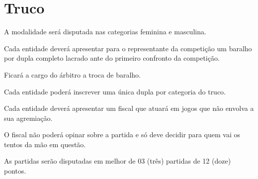 {\let\clearpage\relax \chapter{Truco}}

\begin{article}
	A modalidade será disputada nas categorias feminina e masculina.
\end{article}

\begin{article}
	Cada entidade deverá apresentar para o representante da competição um baralho por dupla completo lacrado ante do primeiro confronto da competição.

	\begin{xparagraph}
		Ficará a cargo do árbitro a troca de baralho.
	\end{xparagraph}
\end{article}

\begin{article}
	Cada entidade poderá inscrever uma única dupla por categoria do truco.
\end{article}

\begin{article}
	Cada entidade deverá apresentar um fiscal que atuará em jogos que não envolva a sua agremiação.

	\begin{xparagraph}
		O fiscal não poderá opinar sobre a partida e só deve decidir para quem vai os tentos da mão em questão.
	\end{xparagraph}
\end{article}

\begin{article}
	As partidas serão disputadas em melhor de 03 (três) partidas de 12 (doze) pontos.
\end{article}

